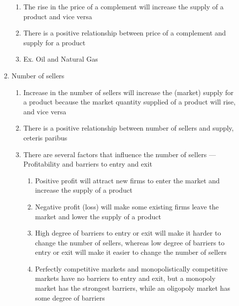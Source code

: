 \documentclass[12pt]{article}
\begin{document}
\begin{enumerate}
\begin{enumerate}
\begin{enumerate}
              \item The rise in the price of a complement will increase the supply of a product and vice versa

              \item There is a positive relationship between price of a complement and supply for a product

              \item Ex. Oil and Natural Gas

            \end{enumerate}

          \item Number of sellers

            \begin{enumerate}
                
              \item Increase in the number of sellers will increase the (market) supply for a product because the market quantity supplied of a product will rise, and vice versa

              \item There is a positive relationship between number of sellers and supply, ceteris paribus

              \item There are several factors that influence the number of sellers — Profitability and barriers to entry and exit

                \begin{enumerate}

                  \item Positive profit will attract new firms to enter the market and increase the supply of a product

                  \item Negative profit (loss) will make some existing firms leave the market and lower the supply of a product

                  \item High degree of barriers to entry or exit will make it harder to change the number of sellers, whereas low degree of barriers to entry or exit will make it easier to change the number of sellers

                  \item Perfectly competitive markets and monopolistically competitive markets have no barriers to entry and exit, but a monopoly market has the strongest barriers, while an oligopoly market has some degree of barriers


\end{enumerate}
\end{enumerate}
\end{enumerate}
\end{enumerate}
\end{document}
